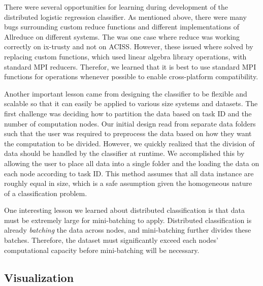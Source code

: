 There were several opportunities for learning during development of the distributed logistic regression classifier.  As mentioned above, there were many bugs surrounding custom reduce functions and different implementations of Allreduce on different systems.  The was one case where reduce was working correctly on ix-trusty and not on ACISS.  However, these issued where solved by replacing custom functions, which used linear algebra library operations, with standard MPI reducers.  Therefor, we learned that it is best to use standard MPI functions for operations whenever possible to enable cross-platform compatibility.

Another important lesson came from designing the classifier to be flexible and scalable so that it can easily be applied to various size systems and datasets.  The first challenge was deciding how to partition the data based on task ID and the number of computation nodes.  Our initial design read from separate data folders such that the user was required to preprocess the data based on how they want the computation to be divided.  However, we quickly realized that the division of data should be handled by the classifier at runtime.  We accomplished this by allowing the user to place all data into a single folder and the loading the data on each node according to task ID.  This method assumes that all data instance are roughly equal in size, which is a safe assumption given the homogeneous nature of a classification problem.

One interesting lesson we learned about distributed classification is that data must be extremely large for mini-batching to apply.  Distributed classification is already \emph{batching} the data across nodes, and mini-batching further divides these batches.  Therefore, the dataset must significantly exceed each nodes' computational capacity before mini-batching will be necessary.



\subsection{Visualization}
